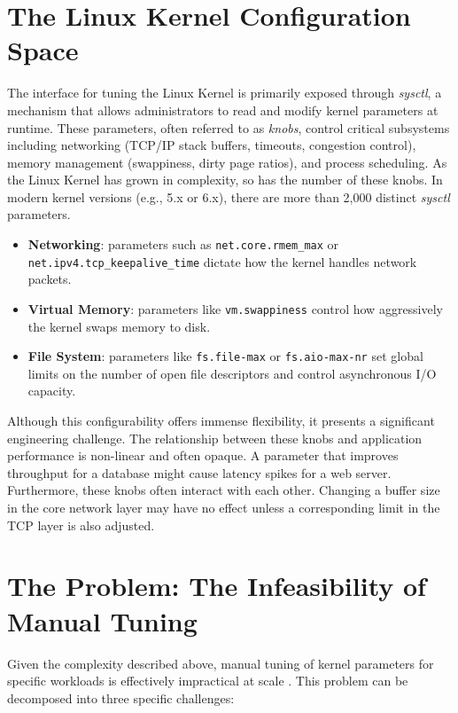 \section{The Linux Kernel Configuration Space}

The interface for tuning the Linux Kernel is primarily exposed through \textit{sysctl}, a mechanism that allows administrators to read and modify kernel parameters at runtime.
These parameters, often referred to as \textit{knobs}, control critical subsystems including networking (TCP/IP stack buffers, timeouts, congestion control), memory management (swappiness, dirty page ratios), and process scheduling.
As the Linux Kernel has grown in complexity, so has the number of these knobs.
In modern kernel versions (e.g., 5.x or 6.x), there are more than 2,000 distinct \textit{sysctl} parameters.

\begin{itemize}
    \item \textbf{Networking}: parameters such as \texttt{net.core.rmem\_max} or \texttt{net.ipv4.tcp\_keepalive\_time} dictate how the kernel handles network packets.
    \item \textbf{Virtual Memory}: parameters like \texttt{vm.swappiness} control how aggressively the kernel swaps memory to disk.
    \item \textbf{File System}: parameters like \texttt{fs.file-max} or \texttt{fs.aio-max-nr} set global limits on the number of open file descriptors and control asynchronous I/O capacity.
\end{itemize}

Although this configurability offers immense flexibility, it presents a significant engineering challenge.
The relationship between these knobs and application performance is non-linear and often opaque.
A parameter that improves throughput for a database might cause latency spikes for a web server.
Furthermore, these knobs often interact with each other.
Changing a buffer size in the core network layer may have no effect unless a corresponding limit in the TCP layer is also adjusted.

\section{The Problem: The Infeasibility of Manual Tuning}

Given the complexity described above, manual tuning of kernel parameters for specific workloads is effectively impractical at scale \cite{kml2021,stun2022}.
This problem can be decomposed into three specific challenges:

